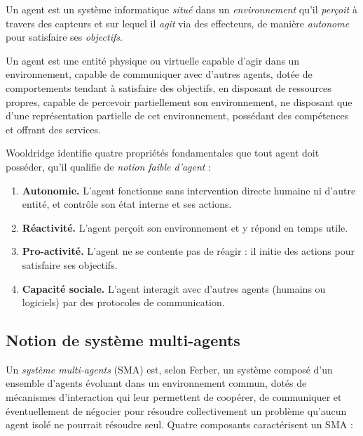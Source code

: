 \begin{description}[leftmargin=*, style=nextline]
    \item[Définition de Wooldridge.] Un agent est un système informatique \emph{situé} dans un \emph{environnement} qu'il \emph{perçoit} à travers des capteurs et sur lequel il \emph{agit} via des effecteurs, de manière \emph{autonome} pour satisfaire ses \emph{objectifs}.
    \item[Définition de Ferber.] Un agent est une entité physique ou virtuelle capable d'agir dans un environnement, capable de communiquer avec d'autres agents, dotée de comportements tendant à satisfaire des objectifs, en disposant de ressources propres, capable de percevoir partiellement son environnement, ne disposant que d'une représentation partielle de cet environnement, possédant des compétences et offrant des services.
\end{description}

Wooldridge identifie quatre propriétés fondamentales que tout agent doit posséder, qu'il qualifie de \emph{notion faible d'agent} :

\begin{enumerate}[leftmargin=*]
    \item \textbf{Autonomie.} L'agent fonctionne sans intervention directe humaine ni d'autre entité, et contrôle son état interne et ses actions.
    \item \textbf{Réactivité.} L'agent perçoit son environnement et y répond en temps utile.
    \item \textbf{Pro-activité.} L'agent ne se contente pas de réagir : il initie des actions pour satisfaire ses objectifs.
    \item \textbf{Capacité sociale.} L'agent interagit avec d'autres agents (humains ou logiciels) par des protocoles de communication.
\end{enumerate}

\subsection{Notion de système multi-agents}

Un \emph{système multi-agents} (SMA) est, selon Ferber, un système composé d'un ensemble d'agents évoluant dans un environnement commun, dotés de mécanismes d'interaction qui leur permettent de coopérer, de communiquer et éventuellement de négocier pour résoudre collectivement un problème qu'aucun agent isolé ne pourrait résoudre seul. Quatre composants caractérisent un SMA :

